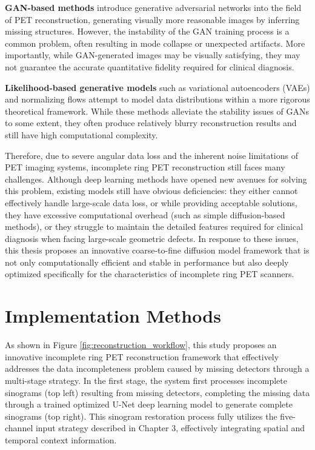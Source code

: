 \documentclass[
reprint,
superscriptaddress,
nofootinbib,
amsmath,amssymb,
aps,
prd,
]{revtex4-2}
\begin{document}
\textbf{GAN-based methods} introduce generative adversarial networks into the field of PET reconstruction, generating visually more reasonable images by inferring missing structures\cite{xue2023cg3dsrganclassificationguided3d}. However, the instability of the GAN training process is a common problem, often resulting in mode collapse or unexpected artifacts. More importantly, while GAN-generated images may be visually satisfying, they may not guarantee the accurate quantitative fidelity required for clinical diagnosis.

\textbf{Likelihood-based generative models} such as variational autoencoders (VAEs) and normalizing flows attempt to model data distributions within a more rigorous theoretical framework. While these methods alleviate the stability issues of GANs to some extent, they often produce relatively blurry reconstruction results and still have high computational complexity.

Therefore, due to severe angular data loss and the inherent noise limitations of PET imaging systems, incomplete ring PET reconstruction still faces many challenges. Although deep learning methods have opened new avenues for solving this problem, existing models still have obvious deficiencies: they either cannot effectively handle large-scale data loss, or while providing acceptable solutions, they have excessive computational overhead (such as simple diffusion-based methods), or they struggle to maintain the detailed features required for clinical diagnosis when facing large-scale geometric defects. In response to these issues, this thesis proposes an innovative coarse-to-fine diffusion model framework that is not only computationally efficient and stable in performance but also deeply optimized specifically for the characteristics of incomplete ring PET scanners.

\section{Implementation Methods}
\label{chap:methods}


As shown in Figure \ref{fig:reconstruction_workflow}, this study proposes an innovative incomplete ring PET reconstruction framework that effectively addresses the data incompleteness problem caused by missing detectors through a multi-stage strategy. In the first stage, the system first processes incomplete sinograms (top left) resulting from missing detectors, completing the missing data through a trained optimized U-Net deep learning model to generate complete sinograms (top right). This sinogram restoration process fully utilizes the five-channel input strategy described in Chapter 3, effectively integrating spatial and temporal context information.
\end{document}
